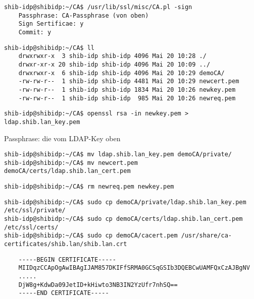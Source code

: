 \begin{lstlisting}
shib-idp@shibidp:~/CA$ /usr/lib/ssl/misc/CA.pl -sign
	Passphrase: CA-Passphrase (von oben)
	Sign Sertificae: y
	Commit: y
\end{lstlisting}
\begin{lstlisting}
shib-idp@shibidp:~/CA$ ll
	drwxrwxr-x  3 shib-idp shib-idp 4096 Mai 20 10:28 ./
	drwxr-xr-x 20 shib-idp shib-idp 4096 Mai 20 10:09 ../
	drwxrwxr-x  6 shib-idp shib-idp 4096 Mai 20 10:29 demoCA/
	-rw-rw-r--  1 shib-idp shib-idp 4481 Mai 20 10:29 newcert.pem
	-rw-rw-r--  1 shib-idp shib-idp 1834 Mai 20 10:26 newkey.pem
	-rw-rw-r--  1 shib-idp shib-idp  985 Mai 20 10:26 newreq.pem
\end{lstlisting}
\begin{lstlisting}
shib-idp@shibidp:~/CA$ openssl rsa -in newkey.pem > ldap.shib.lan_key.pem
\end{lstlisting}
Passphrase: die vom LDAP-Key oben\newline
{}
\begin{lstlisting}
shib-idp@shibidp:~/CA$ mv ldap.shib.lan_key.pem demoCA/private/
shib-idp@shibidp:~/CA$ mv newcert.pem demoCA/certs/ldap.shib.lan_cert.pem
\end{lstlisting}
\begin{lstlisting}
shib-idp@shibidp:~/CA$ rm newreq.pem newkey.pem
\end{lstlisting}
\begin{lstlisting}
shib-idp@shibidp:~/CA$ sudo cp demoCA/private/ldap.shib.lan_key.pem /etc/ssl/private/
shib-idp@shibidp:~/CA$ sudo cp demoCA/certs/ldap.shib.lan_cert.pem /etc/ssl/certs/
shib-idp@shibidp:~/CA$ sudo cp demoCA/cacert.pem /usr/share/ca-certificates/shib.lan/shib.lan.crt
\end{lstlisting}

\begin{lstlisting}
	-----BEGIN CERTIFICATE-----
	MIIDqzCCApOgAwIBAgIJAM857DKIFfSRMA0GCSqGSIb3DQEBCwUAMFQxCzAJBgNV
	.....
	DjW8g+KdwDa09JetID+kHiwto3NB3IN2YzUfr7nhSQ==
	-----END CERTIFICATE-----
\end{lstlisting}

